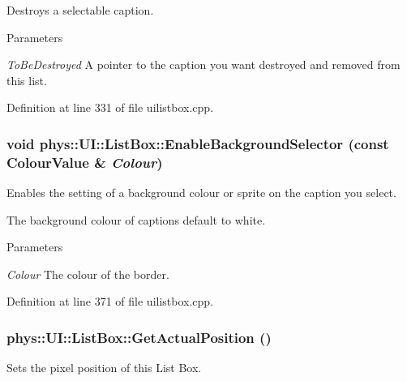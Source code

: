 Destroys a selectable caption. 


\begin{DoxyParams}{Parameters}
\item[{\em ToBeDestroyed}]A pointer to the caption you want destroyed and removed from this list. \end{DoxyParams}


Definition at line 331 of file uilistbox.cpp.

\hypertarget{classphys_1_1UI_1_1ListBox_a2f3612cc6062a279f0b6f69a1b2fc4eb}{
\subsubsection[{EnableBackgroundSelector}]{\setlength{\rightskip}{0pt plus 5cm}void phys::UI::ListBox::EnableBackgroundSelector (const {\bf ColourValue} \& {\em Colour})}}
\label{d0/d28/classphys_1_1UI_1_1ListBox_a2f3612cc6062a279f0b6f69a1b2fc4eb}


Enables the setting of a background colour or sprite on the caption you select. 

The background colour of captions default to white. 
\begin{DoxyParams}{Parameters}
\item[{\em Colour}]The colour of the border. \end{DoxyParams}


Definition at line 371 of file uilistbox.cpp.

\hypertarget{classphys_1_1UI_1_1ListBox_a44046453283fb2c54e10dc868705352a}{
\subsubsection[{GetActualPosition}]{ phys::UI::ListBox::GetActualPosition ()}}
\label{d0/d28/classphys_1_1UI_1_1ListBox_a44046453283fb2c54e10dc868705352a}


Sets the pixel position of this List Box. 

